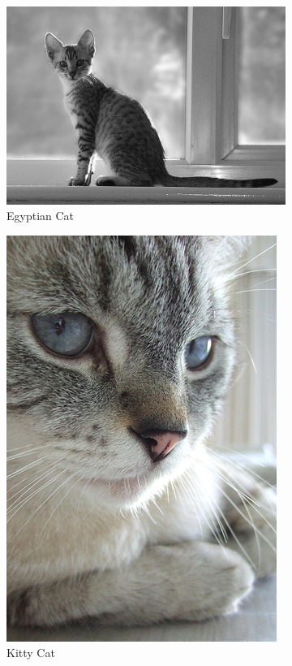\documentclass[conference]{IEEEtran}
\begin{document}
\begin{spacing}{0.9}
\begin{figure}
\begin{subfigure}{.15\textwidth}
  \centering
  \includegraphics[scale=0.1]{classTypeExample5.jpg}
  \caption{Egyptian Cat}
\end{subfigure}
\begin{subfigure}{.15\textwidth}
  \centering
  \includegraphics[scale=0.11]{classTypeExample6.jpg}
  \caption{Kitty Cat}
\end{subfigure}
\begin{subfigure}{.15\textwidth}
  \centering

\end{subfigure}
\end{figure}
\end{spacing}
\end{document}
